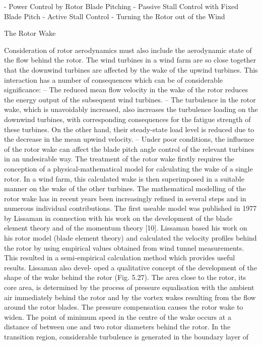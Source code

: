 - Power Control by Rotor Blade Pitching
- Passive Stall Control with Fixed Blade Pitch
- Active Stall Control
- Turning the Rotor out of the Wind

The Rotor Wake

Consideration of rotor aerodynamics must also include the aerodynamic state of the flow
behind the rotor. The wind turbines in a wind farm are so close together that the downwind
turbines are affected by the wake of the upwind turbines. This interaction has a number of
consequences which can be of considerable significance:
– The reduced mean flow velocity in the wake of the rotor reduces the energy output of
the subsequent wind turbines.
– The turbulence in the rotor wake, which is unavoidably increased, also increases the
turbulence loading on the downwind turbines, with corresponding consequences for
the fatigue strength of these turbines. On the other hand, their steady-state load level is
reduced due to the decrease in the mean upwind velocity.
– Under poor conditions, the influence of the rotor wake can affect the blade pitch angle
control of the relevant turbines in an undesirable way.
The treatment of the rotor wake firstly requires the conception of a physical-mathematical
model for calculating the wake of a single rotor. In a wind farm, this calculated wake is
then superimposed in a suitable manner on the wake of the other turbines.
The mathematical modelling of the rotor wake has in recent years been increasingly
refined in several steps and in numerous individual contributions. The first useable model
was published in 1977 by Lissaman in connection with his work on the development of
the blade element theory and of the momentum theory [10]. Lissaman based his work
on his rotor model (blade element theory) and calculated the velocity profiles behind the
rotor by using empirical values obtained from wind tunnel measurements. This resulted
in a semi-empirical calculation method which provides useful results. Lissaman also devel-
oped a qualitative concept of the development of the shape of the wake behind the rotor
(Fig. 5.27).
The area close to the rotor, its core area, is determined by the process of pressure
equalisation with the ambient air immediately behind the rotor and by the vortex wakes
resulting from the flow around the rotor blades. The pressure compensation causes the
rotor wake to widen. The point of minimum speed in the centre of the wake occurs at a
distance of between one and two rotor diameters behind the rotor.
In the transition region, considerable turbulence is generated in the boundary layer of
